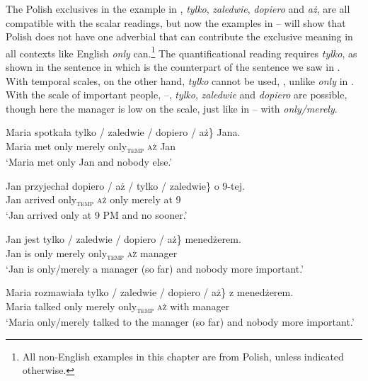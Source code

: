 \documentclass[output=paper,colorlinks,citecolor=brown]{langscibook}
\begin{document}
\noindent The Polish exclusives in the example in , \textit{tylko}, \textit{zaledwie}, \textit{dopiero} and \textit{aż}, are all compatible with the scalar readings, but now the examples in -- will show that Polish does not have one adverbial that can contribute the exclusive meaning in all contexts like %
English \textit{only} can.\footnote{All non-English examples in this chapter are from Polish, unless indicated otherwise.} The quantificational reading requires \textit{tylko}, as shown in the sentence in  which is the counterpart of the sentence we saw in . With temporal scales, on the other hand, \textit{tylko} cannot be used, , unlike \textit{only} in . With the scale of important people, --, \textit{tylko}, \textit{zaledwie} and \textit{dopiero} are possible, though here the manager is low on the scale, just like in -- with \textit{only/merely}.

\ea\label{ex:tom:9}
\gll Maria   spotkała \minsp{\{} tylko / \minsp{\#} zaledwie / \minsp{\#} dopiero / \minsp{\#} aż\}   Jana.\\
Maria  met {} only {} {} merely {} {}  only\textsubscript{\textsc{temp}} {} {} \textsc{aż}            Jan\\
\glt ‘Maria met only Jan and nobody else.’
\z

\ea\label{ex:tom:10}
\gll Jan   przyjechał  \minsp{\{} dopiero / aż / \minsp{\#} tylko /  zaledwie\}   o   9-tej.\\
Jan arrived {} only\textsubscript{\textsc{temp}} {} \textsc{aż} {} {} only {} {} merely at 9\\
\glt ‘Jan arrived only at 9 PM and no sooner.’
\z 

\ea\label{ex:tom:11}
\gll Jan jest \minsp{\{} tylko / zaledwie / dopiero /  \minsp{\#} aż\}     menedżerem.\\
Jan is {} only {} merely {}  only\textsubscript{\textsc{temp}} {} {} \textsc{aż} manager\\
\glt ‘Jan is only/merely a manager (so far) and nobody more important.’
\z 

\ea\label{ex:tom:12}
\gll Maria rozmawiała \minsp{\{} tylko / zaledwie / dopiero / \minsp{\#} aż\} z menedżerem.\\
Maria talked {} only {} merely {} only\textsubscript{\textsc{temp}} {} {} \textsc{aż} with manager\\
\glt ‘Maria only/merely talked to the manager (so far) and nobody more important.’
\z 
\end{document}
